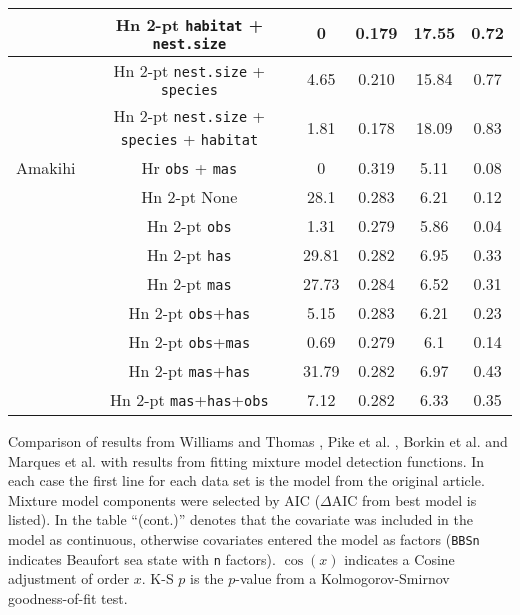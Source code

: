 \documentclass[10pt]{article}
\begin{document}
\begin{table}[!ht]
\begin{tabular}{| c | c | c | c | c | c |}
 \hline
 & Hn 2-pt \texttt{habitat} + \texttt{nest.size}                     &  0      &  0.179  &  17.55  &  0.72 \\
 \hline
 & Hn 2-pt \texttt{nest.size} + \texttt{species}                     &  4.65   &  0.210  &  15.84  &  0.77 \\
 \hline
 & Hn 2-pt \texttt{nest.size} + \texttt{species} + \texttt{habitat}  &  1.81   &  0.178  &  18.09  &  0.83 \\
\hline
Amakihi  & Hr \texttt{obs} + \texttt{mas} & 0 &  0.319 & 5.11 & 0.08\\ %
\hline
 & Hn 2-pt None                                    &  28.1   &  0.283  &  6.21  &  0.12 \\
\hline
 & Hn 2-pt \texttt{obs}                            &  1.31   &  0.279  &  5.86  &  0.04 \\
\hline
 & Hn 2-pt \texttt{has}                            &  29.81  &  0.282  &  6.95  &  0.33 \\
\hline
 & Hn 2-pt \texttt{mas}                            &  27.73  &  0.284  &  6.52  &  0.31 \\
\hline
 & Hn 2-pt \texttt{obs}+\texttt{has}               &  5.15   &  0.283  &  6.21  &  0.23 \\
\hline
 & Hn 2-pt \texttt{obs}+\texttt{mas}               &  0.69   &  0.279  &  6.1  &  0.14 \\
\hline
 & Hn 2-pt \texttt{mas}+\texttt{has}               &  31.79  &  0.282  &  6.97  &  0.43 \\
\hline
 & Hn 2-pt \texttt{mas}+\texttt{has}+\texttt{obs}  &  7.12  &  0.282  &  6.33  &  0.35 \\
\hline
\end{tabular}
\begin{flushleft}Comparison of results from Williams and Thomas \cite{Williams:2007tc}, Pike et al. \cite{Pike:2003ug}, Borkin et al. \cite{Borkin:2012vj} and Marques et al. \cite{Marques:2007vm} with results from fitting mixture model detection functions. In each case the first line for each data set is the model from the original article. Mixture model components were selected by AIC ($\Delta$AIC from best model is listed). In the table ``(cont.)'' denotes that the covariate was included in the model as continuous, otherwise covariates entered the model as factors (\texttt{BBSn} indicates Beaufort sea state with \texttt{n} factors). $\cos(x)$ indicates a Cosine adjustment of order $x$. K-S $p$ is the $p$-value from a Kolmogorov-Smirnov goodness-of-fit test.
\end{flushleft}
\label{williams-pike-table}
\end{table}
\end{document}

